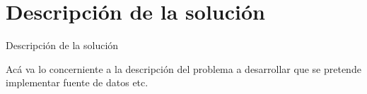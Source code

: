 \section{Descripción de la solución}
Descripción de la solución

Acá va lo concerniente a la descripción del problema a desarrollar
que se pretende implementar fuente de datos etc.


